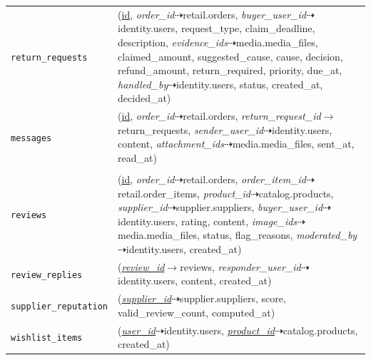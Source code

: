 \begin{longtable}{L{3.10cm} L{11.90cm}}
\texttt{return\_\allowbreak{}requests} & (\underline{id}, \textit{order\_\allowbreak{}id}$\dashrightarrow$retail.orders, \textit{buyer\_\allowbreak{}user\_\allowbreak{}id}$\dashrightarrow$identity.users, request\_\allowbreak{}type, claim\_\allowbreak{}deadline, description, \textit{evidence\_\allowbreak{}ids}$\dashrightarrow$media.media\_\allowbreak{}files, claimed\_\allowbreak{}amount, suggested\_\allowbreak{}cause, cause, decision, refund\_\allowbreak{}amount, return\_\allowbreak{}required, priority, due\_\allowbreak{}at, \textit{handled\_\allowbreak{}by}$\dashrightarrow$identity.users, status, created\_\allowbreak{}at, decided\_\allowbreak{}at) \\
\texttt{messages} & (\underline{id}, \textit{order\_\allowbreak{}id}$\dashrightarrow$retail.orders, \textit{return\_\allowbreak{}request\_\allowbreak{}id}$\rightarrow$return\_\allowbreak{}requests, \textit{sender\_\allowbreak{}user\_\allowbreak{}id}$\dashrightarrow$identity.users, content, \textit{attachment\_\allowbreak{}ids}$\dashrightarrow$media.media\_\allowbreak{}files, sent\_\allowbreak{}at, read\_\allowbreak{}at) \\
 \\
\texttt{reviews} & (\underline{id}, \textit{order\_\allowbreak{}id}$\dashrightarrow$retail.orders, \textit{order\_\allowbreak{}item\_\allowbreak{}id}$\dashrightarrow$retail.order\_\allowbreak{}items, \textit{product\_\allowbreak{}id}$\dashrightarrow$catalog.products, \textit{supplier\_\allowbreak{}id}$\dashrightarrow$supplier.suppliers, \textit{buyer\_\allowbreak{}user\_\allowbreak{}id}$\dashrightarrow$identity.users, rating, content, \textit{image\_\allowbreak{}ids}$\dashrightarrow$media.media\_\allowbreak{}files, status, flag\_\allowbreak{}reasons, \textit{moderated\_\allowbreak{}by}$\dashrightarrow$identity.users, created\_\allowbreak{}at) \\
\texttt{review\_\allowbreak{}replies} & (\textit{\underline{review\_\allowbreak{}id}}$\rightarrow$reviews, \textit{responder\_\allowbreak{}user\_\allowbreak{}id}$\dashrightarrow$identity.users, content, created\_\allowbreak{}at) \\
\texttt{supplier\_\allowbreak{}reputation} & (\textit{\underline{supplier\_\allowbreak{}id}}$\dashrightarrow$supplier.suppliers, score, valid\_\allowbreak{}review\_\allowbreak{}count, computed\_\allowbreak{}at) \\
\texttt{wishlist\_\allowbreak{}items} & (\textit{\underline{user\_\allowbreak{}id}}$\dashrightarrow$identity.users, \textit{\underline{product\_\allowbreak{}id}}$\dashrightarrow$catalog.products, created\_\allowbreak{}at) \\

\end{longtable}
